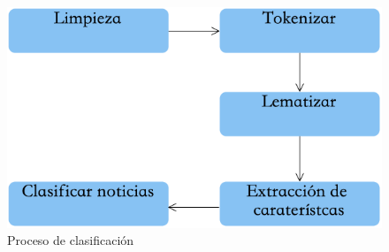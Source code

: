 \begin{figure}[H]
\centering
\includegraphics[scale=0.55]{imagenes/Capitulo5/AplicacionWeb/PreprocesamientoWeb.png}
\caption{Proceso de clasificación}
\label{fig:cp5:clasificacion}
\end{figure}

